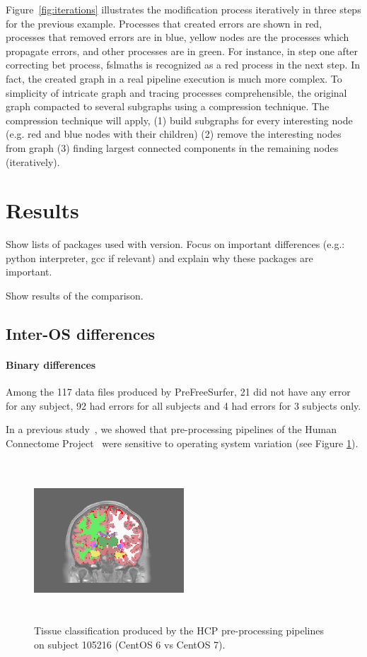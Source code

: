 \documentclass{article}
\begin{document}
Figure~\ref{fig:iterations} illustrates the modification process iteratively in three steps for the previous example.
 Processes that created errors are shown in red, processes that removed errors are in blue,
 yellow nodes are the processes which propagate errors, and other processes are in green.
 For instance, in step one after correcting bet process, fslmaths is recognized as a red process in the next step.
In fact, the created graph in a real pipeline execution is much more complex. 
To simplicity of intricate graph and tracing processes comprehensible, 
the original graph compacted to several subgraphs using a compression technique. 
The compression technique will apply, (1) build subgraphs for every interesting node (e.g. red and blue nodes with their children)
 (2) remove the interesting nodes from graph (3) finding largest connected components in the remaining nodes (iteratively).

\section{Results}

Show lists of packages used with version. Focus on important
differences (e.g.: python interpreter, gcc if relevant) and explain
why these packages are important.

Show results of the comparison.

\subsection{Inter-OS differences}


\paragraph{Binary differences}


Among the 117 data files produced by PreFreeSurfer, 21 did not have any error for any subject, 92 had errors 
for all subjects and 4 had errors for 3 subjects only. 

In a previous study~\cite{Scaria2017}, we showed that
pre-processing pipelines of the Human Connectome
Project~\cite{Glasser2013} were sensitive to operating system
variation (see Figure \ref{fig:1}).
\begin{figure}
  \includegraphics[width=0.5\textwidth, height=6cm]{images/brain_classification.png}
  \caption{Tissue classification produced by the HCP pre-processing
    pipelines on subject 105216 (CentOS 6 vs CentOS 7).}
  \label{fig:1}
\end{figure}
\end{document}
